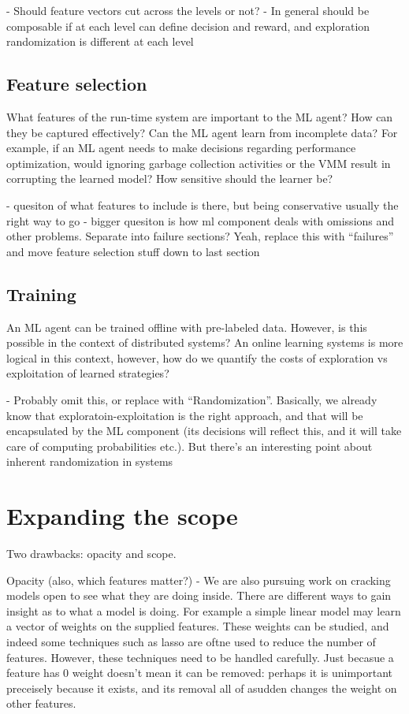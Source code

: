 \documentclass[a4paper,twocolumn]{article}
\begin{document}
- Should feature vectors cut across the levels or not?
- In general should be composable if at each level can define decision and reward,
and exploration randomization is different at each level


\subsection*{Feature selection}
What features of the run-time system are important to the ML agent? How can they
be captured effectively? Can the ML agent learn from incomplete data? For
example, if an ML agent needs to make decisions regarding performance
optimization, would ignoring garbage collection activities or the VMM result in
corrupting the learned model? How sensitive should the learner be?

- quesiton of what features to include is there, but being conservative usually the right
way to go
- bigger quesiton is how ml component deals with omissions and other problems. Separate
into failure sections? Yeah, replace this with ``failures'' and move feature selection stuff
down to last section

\subsection*{Training}
An ML agent can be trained offline with pre-labeled data. However, is this
possible in the context of distributed systems? An online learning systems is
more logical in this context, however, how do we quantify the costs of
exploration vs exploitation of learned strategies?

- Probably omit this, or replace with ``Randomization''. Basically, we already know
that exploratoin-exploitation is the right approach, and that will be encapsulated
by the ML component (its decisions will reflect this, and it will take care of
computing probabilities etc.). But there's an interesting point about inherent randomization
in systems

\section{Expanding the scope}

Two drawbacks: opacity and scope.

Opacity (also, which features matter?)
- We are also pursuing work on cracking models open to see what they are doing inside.
There are different ways to gain insight as to what a model is doing. For example a simple
linear model may learn a vector of weights on the supplied features. These weights can be
studied, and indeed some techniques such as lasso are oftne used to reduce the number of features. However, these
techniques need to be handled carefully. Just becasue a feature has 0 weight doesn't mean it
can be removed: perhaps it is unimportant preceisely because it exists, and its removal all of
asudden changes the weight on other features.
\end{document}
